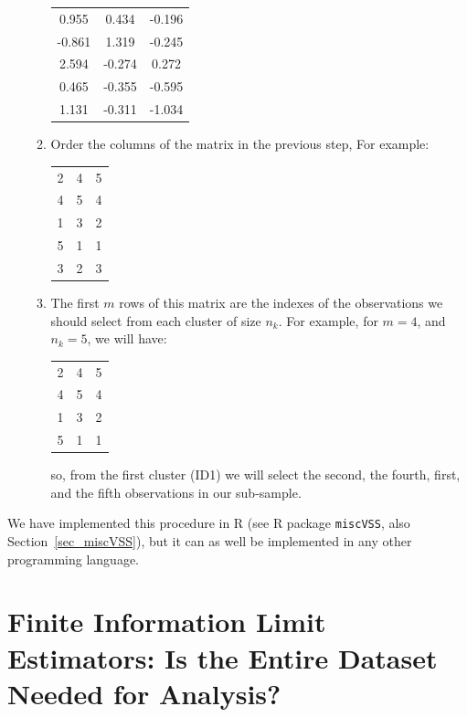 \documentclass[11pt,a5paper,twoside]{book}
\begin{document}
\begin{enumerate}
\begin{enumerate}
	\begin{center}
		\begin{tabular}{ccc}
			 0.955 & 0.434 & -0.196 \\ 
			 -0.861 & 1.319 & -0.245 \\ 
			 2.594 & -0.274 & 0.272 \\ 
			 0.465 & -0.355 & -0.595 \\ 
			 1.131 & -0.311 & -1.034 
		\end{tabular}
	\end{center}
		\item Order the columns of the matrix in the previous step, For example:
		\begin{center}
		\begin{tabular}{ccc}
	   2 &   4 &   5 \\ 
	   4 &   5 &   4 \\ 
	   1 &   3 &   2 \\ 
	   5 &   1 &   1 \\ 
	   3 &   2 &   3 
		\end{tabular}
	\end{center}	
	\item 	The first $m$ rows of this matrix are the indexes of the observations we should select from each cluster of size $n_k$. For example, for $m=4$, and $n_k = 5$, we will have:
		\begin{center}
		\begin{tabular}{ccc}
			2 &   4 &   5 \\ 
			4 &   5 &   4 \\ 
			1 &   3 &   2 \\ 
			5 &   1 &   1 
		\end{tabular}
	\end{center}	
	so, from the first cluster (ID1) we will select the second, the fourth, first, and the fifth observations in our sub-sample. 
	\end{enumerate}
\end{enumerate}

We have implemented this procedure in R (see R package {\tt{miscVSS}}, also Section~\ref{sec_miscVSS}), but it can as well be implemented in any other programming language.



\section[Finite Information Limit Estimators]{Finite Information Limit Estimators: Is the Entire Dataset Needed for Analysis?}
\end{document}
